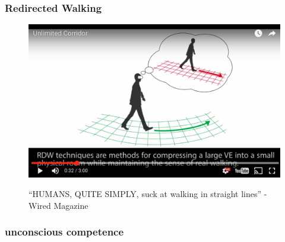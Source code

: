 \begin{frame}
	\frametitle{Redirected Walking}
	\begin{figure}
		\href{https://www.youtube.com/watch?v=THk92rev1VA}{ \includegraphics[scale=.2]{assets/directed}  }
		\caption{``HUMANS, QUITE SIMPLY, suck at walking in straight lines'' - Wired Magazine}
	\end{figure}
		
\end{frame}

\begin{frame}
	\frametitle{unconscious competence}
\end{frame}


